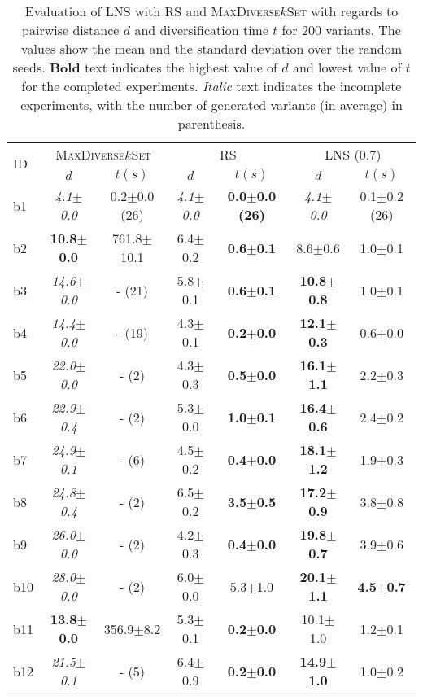 \begin{longtable}{|l|c|c|c|c|c|c|}
\caption{\label{tab:dist_max_rs_lns} Evaluation of \ac{LNS} with \ac{RS} and \textsc{MaxDiverse$k$Set}
		with regards to pairwise distance $d$ and diversification time $t$ for 200 variants. The values
		show the mean and the standard deviation over the random seeds.
		\textbf{Bold} text indicates the highest value of $d$ and lowest value of $t$
		for the completed experiments. 
		\textit{Italic} text indicates the incomplete experiments, 
		with the number of generated variants (in average) in parenthesis.}\\
\hline
\multirow{2}{*}{ID}&\multicolumn{2}{c|}{\textsc{MaxDiverse$k$Set}}&\multicolumn{2}{c|}{{RS}}&\multicolumn{2}{c|}{LNS (0.7)}\\
\cline{2-7}
&$d$&$t(s)$&$d$&$t(s)$&$d$&$t(s)$\\
\hline
b1&\textit{4.1$\pm$0.0} & 0.2$\pm$0.0 (26)&\textit{4.1$\pm$0.0} & \textbf{0.0$\pm$0.0 (26)}&\textit{4.1$\pm$0.0} & 0.1$\pm$0.2 (26)
\\
b2&\textbf{10.8$\pm$0.0} & 761.8$\pm$10.1&6.4$\pm$0.2 & \textbf{0.6$\pm$0.1}&8.6$\pm$0.6 & 1.0$\pm$0.1
\\
b3&\textit{14.6$\pm$0.0} & - (21)&5.8$\pm$0.1 & \textbf{0.6$\pm$0.1}&\textbf{10.8$\pm$0.8} & 1.0$\pm$0.1
\\
b4&\textit{14.4$\pm$0.0} & - (19)&4.3$\pm$0.1 & \textbf{0.2$\pm$0.0}&\textbf{12.1$\pm$0.3} & 0.6$\pm$0.0
\\
b5&\textit{22.0$\pm$0.0} & - (2)&4.3$\pm$0.3 & \textbf{0.5$\pm$0.0}&\textbf{16.1$\pm$1.1} & 2.2$\pm$0.3
\\
b6&\textit{22.9$\pm$0.4} & - (2)&5.3$\pm$0.0 & \textbf{1.0$\pm$0.1}&\textbf{16.4$\pm$0.6} & 2.4$\pm$0.2
\\
b7&\textit{24.9$\pm$0.1} & - (6)&4.5$\pm$0.2 & \textbf{0.4$\pm$0.0}&\textbf{18.1$\pm$1.2} & 1.9$\pm$0.3
\\
b8&\textit{24.8$\pm$0.4} & - (2)&6.5$\pm$0.2 & \textbf{3.5$\pm$0.5}&\textbf{17.2$\pm$0.9} & 3.8$\pm$0.8
\\
b9&\textit{26.0$\pm$0.0} & - (2)&4.2$\pm$0.3 & \textbf{0.4$\pm$0.0}&\textbf{19.8$\pm$0.7} & 3.9$\pm$0.6
\\
b10&\textit{28.0$\pm$0.0} & - (2)&6.0$\pm$0.0 & 5.3$\pm$1.0&\textbf{20.1$\pm$1.1} & \textbf{4.5$\pm$0.7}
\\
b11&\textbf{13.8$\pm$0.0} & 356.9$\pm$8.2&5.3$\pm$0.1 & \textbf{0.2$\pm$0.0}&10.1$\pm$1.0 & 1.2$\pm$0.1
\\
b12&\textit{21.5$\pm$0.1} & - (5)&6.4$\pm$0.9 & \textbf{0.2$\pm$0.0}&\textbf{14.9$\pm$1.0} & 1.0$\pm$0.2

\end{longtable}
